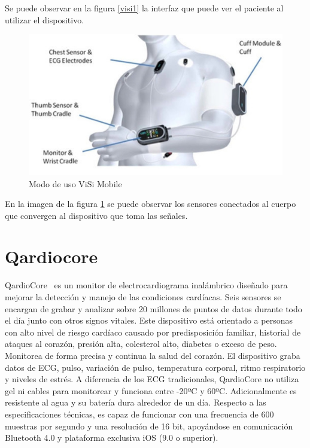 Se puede observar en la figura \ref{visi1} la interfaz que puede ver el paciente al utilizar el dispositivo.

\begin{figure}[H]
	\centering
	\includegraphics[scale=0.7]{figuras/estadoarte/visi/wear.jpg}
	\caption{Modo de uso ViSi Mobile\textregistered}
	\label{visi2}
\end{figure}

En la imagen de la figura \ref{visi2} se puede observar los sensores conectados al cuerpo que convergen al dispositivo que toma las señales.

\section{Qardiocore\textregistered}

QardioCore\textregistered\ \cite{qardio} es un monitor de electrocardiograma inalámbrico diseñado para mejorar la detección y manejo de las condiciones cardíacas. Seis sensores se encargan de grabar y analizar sobre 20 millones de puntos de datos durante todo el día junto con otros signos vitales. Este dispositivo está orientado a personas con alto nivel de riesgo cardíaco causado por predisposición familiar, historial de ataques al corazón, presión alta, colesterol alto, diabetes o exceso de peso. Monitorea de forma precisa y continua la salud del corazón. El dispositivo graba datos de ECG, pulso, variación de pulso, temperatura corporal, ritmo respiratorio y niveles de estrés. A diferencia de los ECG tradicionales, QardioCore no utiliza gel ni cables para monitorear y funciona entre -20ºC y 60ºC. Adicionalmente es resistente al agua y su batería dura alrededor de un día. Respecto a las especificaciones técnicas, es capaz de funcionar con una frecuencia de 600 muestras por segundo y una resolución de 16 bit, apoyándose en comunicación Bluetooth 4.0 y plataforma exclusiva iOS (9.0 o superior)\cite{qardio_tel}.

